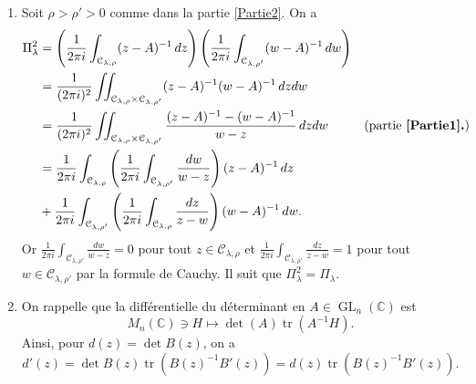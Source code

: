 \documentclass[french]{article}
\theoremstyle{definition}
\newcommand{\tuple}[1]{\left(#1\right)}
\newcommand{\Cbb}{\mathbb{C}}
\newcommand{\Ccal}{\mathcal{C}}
\newcommand{\tr}{\operatorname{tr}}
\newcommand{\GL}{\operatorname{GL}}
\newcommand{\ds}{\displaystyle}
\begin{document}
\begin{enumerate}
    \item \label{Partie3} Soit $\rho > \rho' > 0$ comme dans la partie \ref{Partie2}. On a
        \begin{align*}
            \Pi_\lambda^2 & = \tuple{\frac{1}{2\pi i} \int_{\Ccal_{\lambda,\rho}} (z - A)^{-1}\,dz}\tuple{\frac{1}{2\pi i} \int_{\Ccal_{\lambda,\rho'}} (w - A)^{-1}\,dw} \\
            & = \frac{1}{(2\pi i)^2} \iint_{\Ccal_{\lambda,\rho} \times \Ccal_{\lambda,\rho'}} (z - A)^{-1}(w - A)^{-1} \,dzdw \\
            & = \frac{1}{(2\pi i)^2}\iint_{\Ccal_{\lambda,\rho} \times \Ccal_{\lambda,\rho'}} \frac{(z - A)^{-1} - (w - A)^{-1}}{w - z}\,dzdw & \text{(partie {\bf\ref{Partie1}.})}\\
            & = \frac{1}{2\pi i}\int_{\Ccal_{\lambda,\rho}} \tuple{\frac{1}{2\pi i}\int_{\Ccal_{\lambda,\rho'}}\frac{dw}{w - z}} (z-A)^{-1}\,dz \\
            & + \frac{1}{2\pi i}\int_{\Ccal_{\lambda,\rho'}} \tuple{\frac{1}{2\pi i}\int_{\Ccal_{\lambda,\rho}}\frac{dz}{z - w}} (w-A)^{-1}\,dw.
        \end{align*}
    Or $\ds \frac{1}{2\pi i}\int_{\Ccal_{\lambda,\rho'}}\frac{dw}{w - z} = 0$ pour tout $z \in \Ccal_{\lambda,\rho}$ et $\ds \frac{1}{2\pi i}\int_{\Ccal_{\lambda,\rho'}}\frac{dz}{z - w} = 1$ pour tout $w \in \Ccal_{\lambda,\rho'}$ par la formule de Cauchy. Il suit que $\Pi_\lambda^2 = \Pi_\lambda$.
    
    \item \label{Partie4} On rappelle que la diff\'erentielle du d\'eterminant en $A \in \GL_n(\Cbb)$ est
        $$M_n(\Cbb) \owns H \mapsto \det(A)\tr(A^{-1}H).$$
    Ainsi, pour $d(z) = \det B(z)$, on a
        $$d'(z) = \det B(z) \tr(B(z)^{-1}B'(z)) = d(z)\tr(B(z)^{-1}B'(z)).$$
    

\end{enumerate}
\end{document}
